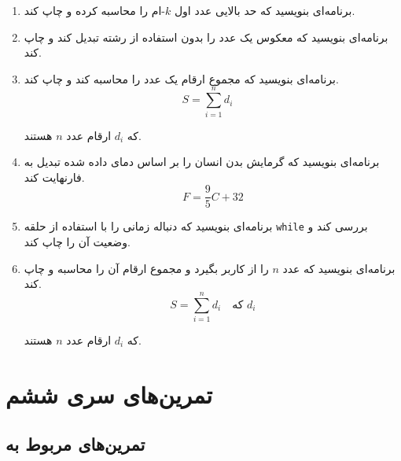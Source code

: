 \documentclass[b5paper,12pt]{article}
\begin{document}
\begin{enumerate}
		\item برنامه‌ای بنویسید که حد بالایی عدد اول \(k\)-ام را محاسبه کرده و چاپ کند.
		
		\item برنامه‌ای بنویسید که معکوس یک عدد را بدون استفاده از رشته تبدیل کند و چاپ کند.
		
		\item برنامه‌ای بنویسید که مجموع ارقام یک عدد را محاسبه کند و چاپ کند.
		\[
		S = \sum_{i=1}^{n} d_i \quad
		\]
		
		
		\begin{center}
			که \( d_i \) ارقام عدد \( n \) هستند.
		\end{center}
		
		
		\item برنامه‌ای بنویسید که گرمایش بدن انسان را بر اساس دمای داده شده تبدیل به فارنهایت کند.
		\[
		F = \frac{9}{5}C + 32
		\]
		
		\item برنامه‌ای بنویسید که دنباله زمانی را با استفاده از حلقه \texttt{while} بررسی کند و وضعیت آن را چاپ کند.
		
		\item 	برنامه‌ای بنویسید که عدد \(n\) را از کاربر بگیرد و مجموع ارقام آن را محاسبه و چاپ کند.
		\[
		S = \sum_{i=1}^{n} d_i \quad \text{که } d_i
		\]
		
		\begin{center}
			که \( d_i \) ارقام عدد \( n \) هستند.
		\end{center}
	
	\end{enumerate}
	
	
	
	\newpage
	\section*{تمرین‌های سری ششم}
	
	\subsection*{تمرین‌های مربوط به }
	
\end{document}
